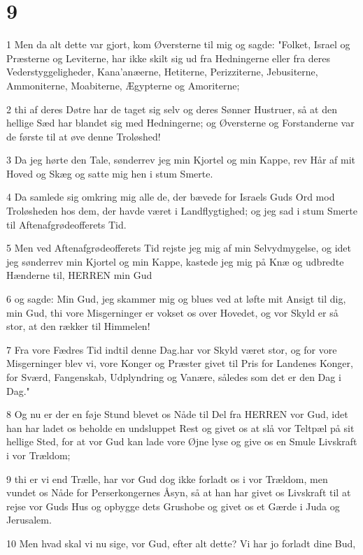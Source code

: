 \chapter{9}

\par 1 Men da alt dette var gjort, kom Øversterne til mig og sagde: "Folket, Israel og Præsterne og Leviterne, har ikke skilt sig ud fra Hedningerne eller fra deres Vederstyggeligheder, Kana'anæerne, Hetiterne, Perizziterne, Jebusiterne, Ammoniterne, Moabiterne, Ægypterne og Amoriterne;
\par 2 thi af deres Døtre har de taget sig selv og deres Sønner Hustruer, så at den hellige Sæd har blandet sig med Hedningerne; og Øversterne og Forstanderne var de første til at øve denne Troløshed!
\par 3 Da jeg hørte den Tale, sønderrev jeg min Kjortel og min Kappe, rev Hår af mit Hoved og Skæg og satte mig hen i stum Smerte.
\par 4 Da samlede sig omkring mig alle de, der bævede for Israels Guds Ord mod Troløsheden hos dem, der havde været i Landflygtighed; og jeg sad i stum Smerte til Aftenafgrødeofferets Tid.
\par 5 Men ved Aftenafgrødeofferets Tid rejste jeg mig af min Selvydmygelse, og idet jeg sønderrev min Kjortel og min Kappe, kastede jeg mig på Knæ og udbredte Hænderne til, HERREN min Gud
\par 6 og sagde: Min Gud, jeg skammer mig og blues ved at løfte mit Ansigt til dig, min Gud, thi vore Misgerninger er vokset os over Hovedet, og vor Skyld er så stor, at den rækker til Himmelen!
\par 7 Fra vore Fædres Tid indtil denne Dag.har vor Skyld været stor, og for vore Misgerninger blev vi, vore Konger og Præster givet til Pris for Landenes Konger, for Sværd, Fangenskab, Udplyndring og Vanære, således som det er den Dag i Dag."
\par 8 Og nu er der en føje Stund blevet os Nåde til Del fra HERREN vor Gud, idet han har ladet os beholde en undsluppet Rest og givet os at slå vor Teltpæl på sit hellige Sted, for at vor Gud kan lade vore Øjne lyse og give os en Smule Livskraft i vor Trældom;
\par 9 thi er vi end Trælle, har vor Gud dog ikke forladt os i vor Trældom, men vundet os Nåde for Perserkongernes Åsyn, så at han har givet os Livskraft til at rejse vor Guds Hus og opbygge dets Grushobe og givet os et Gærde i Juda og Jerusalem.
\par 10 Men hvad skal vi nu sige, vor Gud, efter alt dette? Vi har jo forladt dine Bud,
